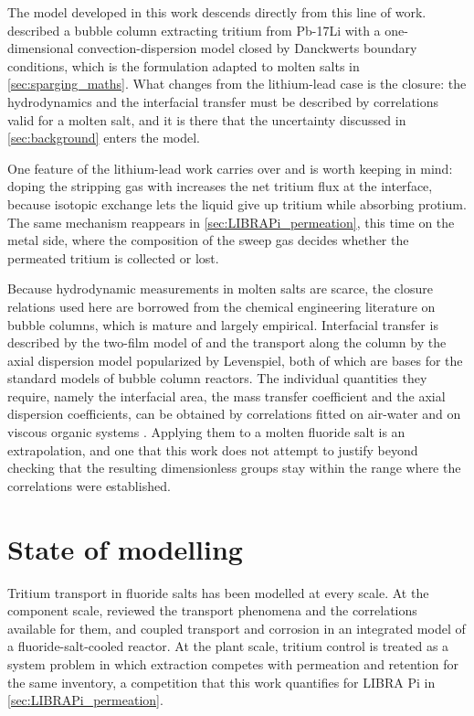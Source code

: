 \documentclass[a4paper,11pt,oneside]{report}
\begin{document}
The model developed in this work descends directly from this line of work. \textcite{malara_tritium_1995} described a bubble column extracting tritium from Pb-17Li with a one-dimensional convection-dispersion model closed by Danckwerts boundary conditions, which is the formulation adapted to molten salts in \cref{sec:sparging_maths}. What changes from the lithium-lead case is the closure: the hydrodynamics and the interfacial transfer must be described by correlations valid for a molten salt, and it is there that the uncertainty discussed in \cref{sec:background} enters the model.

One feature of the lithium-lead work carries over and is worth keeping in mind: doping the stripping gas with  increases the net tritium flux at the interface, because isotopic exchange lets the liquid give up tritium while absorbing protium\cite{ricapito_tritium_2011}. The same mechanism reappears in \cref{sec:LIBRAPi_permeation}, this time on the metal side, where the composition of the sweep gas decides whether the permeated tritium is collected or lost.

Because hydrodynamic measurements in molten salts are scarce, the closure relations used here are borrowed from the chemical engineering literature on bubble columns, which is mature and largely empirical. Interfacial transfer is described by the two-film model of \textcite{lewis_principles_1924} and the transport along the column by the axial dispersion model popularized by Levenspiel, both of which are bases for the standard models of bubble column reactors\cite{levenspiel_chemical_1999,schluter_modeling_1992}. The individual quantities they require, namely the interfacial area, the mass transfer coefficient and the axial dispersion coefficients, can be obtained by correlations fitted on air-water and on viscous organic systems \cite{calderbank_continuous_1961,deckwer_mixing_1974,bhavaraju_design_1978,hebrard_characterization_1999}. Applying them to a molten fluoride salt is an extrapolation, and one that this work does not attempt to justify beyond checking that the resulting dimensionless groups stay within the range where the correlations were established.


\section{State of modelling}

Tritium transport in fluoride salts has been modelled at every scale. At the component scale, \textcite{humrickhouse_tritium_2020} reviewed the transport phenomena and the correlations available for them, and \textcite{stempien_integrated_2016} coupled transport and corrosion in an integrated model of a fluoride-salt-cooled reactor. At the plant scale, tritium control is treated as a system problem in which extraction competes with permeation and retention for the same inventory\cite{forsberg_tritium_2017,christensen_tritium_2018}, a competition that this work quantifies for LIBRA Pi in \cref{sec:LIBRAPi_permeation}.
\end{document}
